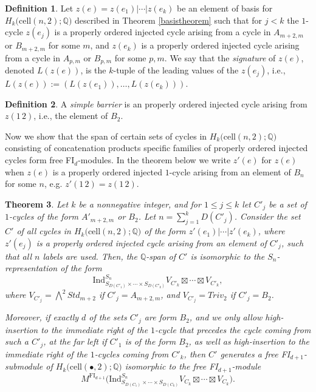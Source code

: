 \documentclass[12py]{amsart}%
\newtheorem{thm}{Theorem}[section]
\theoremstyle{definition}\newtheorem{definition}[thm]{Definition}
\theoremstyle{definition}
\newtheorem{defn}[thm]{Definition}
\newcommand{\Q}{\ensuremath{\mathbb{Q}}}
\begin{document}
\begin{defn}
Let $z(e)=z(e_{1})|\cdots|z(e_{k})$ be an element of basis for $H_{k}\big(\text{cell}(n,2);\Q\big)$ described in Theorem \ref{basistheorem} such that for $j<k$ the $1$-cycle $z(e_{j})$ is a properly ordered injected cycle arising from a cycle in $A_{m+2, m}$ or $B_{m+2, m}$ for some $m$, and $z(e_{k})$ is a properly ordered injected cycle arising from a cycle in $A_{p,m}$ or $B_{p,m}$ for some $p, m$. We say that the \emph{signature} of $z(e)$, denoted $L(z(e))$, is the $k$-tuple of the leading values of the $z(e_{j})$, i.e., $L(z(e)):=(L(z(e_{1})),\dots, L(z(e_{k})))$. 
\end{defn}

\begin{defn}
A \emph{simple barrier} is an properly ordered injected cycle arising from $z(1\,2)$, i.e., the element of $B_{2}$.
\end{defn}

Now we show that the span of certain sets of cycles in $H_{k}\big(\text{cell}(n,2);\Q\big)$ consisting of concatenation products specific families of properly ordered injected cycles form free FI$_{d}$-modules. In the theorem below we write $z'(e)$ for $z(e)$ when $z(e)$ is a properly ordered injected $1$-cycle arising from an element of $B_{n}$ for some $n$, e.g. $z'(1\,2)=z(1\,2)$.

\begin{thm}\label{buildanFId}
Let $k$ be a nonnegative integer, and for $1\le j\le k$ let $C'_{j}$ be a set of $1$-cycles of the form $A'_{m+2,m}$ or $B_{2}$. Let $n=\sum_{j=1}^{k}D(C'_{j})$. Consider the set $C'$ of all cycles in $H_{k}\big(\text{cell}(n,2);\Q\big)$ of the form $z'(e_{1})|\cdots|z'(e_{k})$, where $z'(e_{j})$ is a properly ordered injected cycle arising from an element of $C'_{j}$, such that all $n$ labels are used. Then, the $\Q$-span of $C'$ is isomorphic to the $S_{n}$-representation of the form
\[
\text{Ind}^{S_{n}}_{S_{D(C'_{1})}\times \cdots \times S_{D(C'_{k})}}V_{C'_{k}}\boxtimes\cdots \boxtimes V_{C'_{k}},
\]
where $V_{C'_{j}}=\bigwedge^{2}Std_{m+2}$ if $C'_{j}=A_{m+2,m}$, and $V_{C'_{j}}=Triv_{2}$ if $C'_{j}=B_{2}$.

Moreover, if exactly $d$ of the sets $C'_{j}$ are form $B_{2}$, and we only allow high-insertion to the immediate right of the $1$-cycle that precedes the cycle coming from such a $C'_{j}$, at the far left if $C'_{1}$ is of the form $B_{2}$, as well as high-insertion to the immediate right of the $1$-cycles coming from $C'_{k}$, then $C'$ generates a free FI$_{d+1}$-submodule of $H_{k}\big(\text{cell}(\bullet, 2);\Q\big)$ isomorphic to the free FI$_{d+1}$-module
\[
M^{\text{FI}_{d+1}}\big(\text{Ind}^{S_{n}}_{S_{D(C_{1})}\times \cdots \times S_{D(C_{k})}}V_{C_{k}}\boxtimes\cdots \boxtimes V_{C_{k}}\big).
\]
\end{thm}
\end{document}
